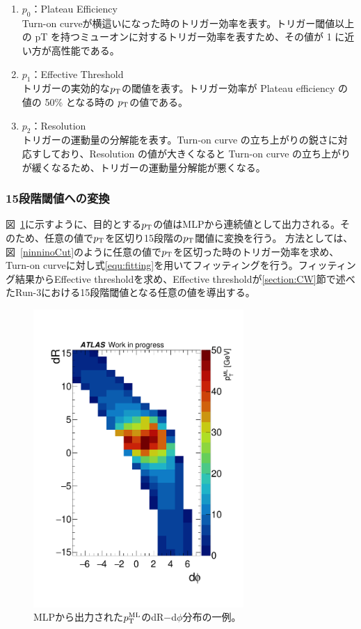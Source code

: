 \begin{enumerate}\label{table:fitting}
   \item $p_0$：Plateau Efficiency\\
   Turn-on curveが横這いになった時のトリガー効率を表す。トリガー閾値以上の pT を持つミューオンに対するトリガー効率を表すため、その値が 1 に近い方が高性能である。
   \item $p_1$：Effective Threshold\\
   トリガーの実効的な$p_{\rm{T}}$の閾値を表す。トリガー効率が Plateau efficiency の値の 50\% となる時の $p_{\rm{T}}$の値である。
   \item $p_2$：Resolution\\
   トリガーの運動量の分解能を表す。Turn-on curve の立ち上がりの鋭さに対応すしており、Resolution の値が大きくなると Turn-on curve の立ち上がりが緩くなるため、トリガーの運動量分解能が悪くなる。
\end{enumerate}

\newpage
\subsubsection{15段階閾値への変換}
図~\ref{fig:all_output}に示すように、目的とする$p_{\rm{T}}$の値はMLPから連続値として出力される。そのため、任意の値で$p_{\rm{T}}$を区切り15段階の$p_{\rm{T}}$閾値に変換を行う。
方法としては、図~\ref{ninninoCut}のように任意の値で$p_{\rm{T}}$を区切った時のトリガー効率を求め、Turn-on curveに対し式\eqref{equ:fitting}を用いてフィッティングを行う。フィッティング結果からEffective thresholdを求め、Effective thresholdが\ref{section:CW}節で述べたRun-3における15段階閾値となる任意の値を導出する。
\begin{figure}[tb]
  \centering
  \hspace*{-1cm}
  \includegraphics[clip, width=8cm]{fig/4/data_phi0_roi33_output.pdf}
  \caption{MLPから出力された$p_{\rm{T}}^{\rm{ML}}$のdR$-$d$\phi$分布の一例。}
  \label{fig:all_output}
\end{figure}

